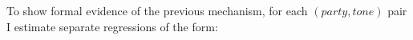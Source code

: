 \documentclass[12pt]{article}
\begin{document}
	
 To show formal evidence of the previous mechanism, for each $({party},{tone})$ pair I estimate separate regressions of the form:
	
	
	

\end{document}
